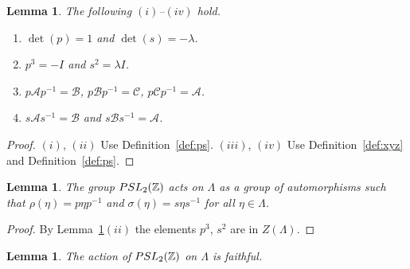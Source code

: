 \documentclass[10pt,a4paper]{amsart}
\numberwithin{equation}{section}
\newtheorem{Lemma}[Theorem]{Lemma}
\begin{document}
\begin{Lemma}
\label{lem:4}
The following $(i)$--$(iv)$ hold.
\begin{enumerate}\itemsep=0pt
\item[$(i)$] $\det (p)=1$ and  $\det (s)=-\lambda$.
\item[$(ii)$]
 $p^3=-I$ and $s^2=\lambda I $.
\item[$(iii)$]
$p \mathcal A p^{-1} = \mathcal B$,
$p  \mathcal B p^{-1} = \mathcal C$,
$p \mathcal C p^{-1} = \mathcal A$.
\item[$(iv)$]
$s \mathcal A s^{-1} = \mathcal B$ and
$s \mathcal B s^{-1} = \mathcal A$.
\end{enumerate}
\end{Lemma}

\begin{proof}
$(i)$, $(ii)$
Use Def\/inition~\ref{def:ps}.
$(iii)$, $(iv)$ Use
Def\/inition~\ref{def:xyz}
and
Def\/inition~\ref{def:ps}.
\end{proof}





\begin{Lemma}
\label{lem:conj}
The group
${\rm  {PSL}}_2(\mathbb Z)$ acts on $\Lambda $ as a group of
automorphisms such
that
$\rho(\eta )= p \eta p^{-1}$
and
$\sigma (\eta ) = s \eta s^{-1}$ for all
$\eta  \in \Lambda $.
\end{Lemma}

\begin{proof}
By Lemma~\ref{lem:4}$(ii)$ the elements  $p^3$, $s^2$ are in $Z(\Lambda)$.
\end{proof}




\begin{Lemma}
\label{lem:faith1}
The action of
${\rm  {PSL}}_2(\mathbb Z)$ on $\Lambda $ is faithful.
\end{Lemma}
\end{document}
